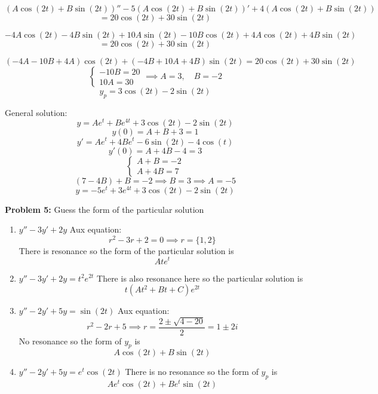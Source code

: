 \documentclass[12pt]{article}
\begin{document}
\[(A\cos(2t) + B\sin(2t))'' - 5(A\cos(2t) + B\sin(2t))' + 4(A\cos(2t) + B\sin(2t))\]
\[= 20\cos(2t) + 30\sin(2t)\]

\[-4A\cos(2t) - 4B\sin(2t) + 10A\sin(2t) - 10B\cos(2t) + 4A\cos(2t) + 4B\sin(2t)\] 
\[= 20\cos(2t) + 30\sin(2t)\]

\[(-4A - 10B + 4A) \cos(2t) + (-4B + 10A + 4B) \sin(2t) = 20\cos(2t) + 30\sin(2t)\]
\[\begin{cases}
    -10B = 20\\
    10A = 30
\end{cases} \implies A = 3, \quad B = -2\]
\[y_p = 3\cos(2t) - 2\sin(2t)\]

General solution:
\[y = Ae^t + Be^{4t} + 3\cos(2t) - 2\sin(2t)\]
\[y(0) = A + B + 3 = 1\]
\[y' = Ae^t + 4Be^t - 6\sin(2t) - 4\cos(t)\]
\[y'(0) = A + 4B - 4 = 3\]
\[\begin{cases}
    A + B = -2\\
    A + 4B = 7
\end{cases}\]
\[(7 -4B) + B = -2 \implies B = 3 \implies A = -5\]
\[\boxed{y = -5e^t + 3e^{4t} + 3\cos(2t) - 2\sin(2t)}\]

\pagebreak 

\textbf{Problem 5:} Guess the form of the particular solution
\begin{enumerate}
    \item $y'' - 3y' + 2y$
    Aux equation:
    \[r^2 - 3r + 2 = 0 \implies r =\{1, 2\}\]
    There is resonance so the form of the particular solution is 
    \[\boxed{Ate^t}\]

    \item $y'' - 3y' + 2y = t^2e ^{2t}$
    There is also resonance here so the particular solution is 
    \[\boxed{t(At^2 + Bt + C)e^{2t}}\]

    \item $y'' - 2y' + 5y = \sin(2t)$
    Aux equation: 
    \[r^2 - 2r + 5 \implies r = \frac{2 \pm \sqrt{4 - 20}}{2} = 1 \pm 2i\]
    No resonance so the form of $y_p$ is 
    \[\boxed{A\cos(2t) + B\sin(2t)}\]

    \item $y'' - 2y' + 5y = e^t\cos(2t)$
    There is no resonance so the form of $y_p$ is 
    \[\boxed{Ae^t \cos(2t) + Be^t\sin(2t)}\]
\end{enumerate}

\pagebreak 
\end{document}
